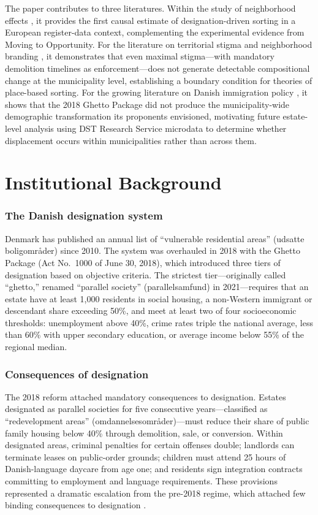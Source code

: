 \documentclass[12pt]{article}
\begin{document}
The paper contributes to three literatures. Within the study of neighborhood effects \citep{kling2007experimental, chetty2016effects}, it provides the first causal estimate of designation-driven sorting in a European register-data context, complementing the experimental evidence from Moving to Opportunity. For the literature on territorial stigma and neighborhood branding \citep{wacquant2007territorial, jensen2012making, galster2017drives}, it demonstrates that even maximal stigma---with mandatory demolition timelines as enforcement---does not generate detectable compositional change at the municipality level, establishing a boundary condition for theories of place-based sorting. For the growing literature on Danish immigration policy \citep{damm2014neighborhood, schultz2019permanent, foged2022language}, it shows that the 2018 Ghetto Package did not produce the municipality-wide demographic transformation its proponents envisioned, motivating future estate-level analysis using DST Research Service microdata to determine whether displacement occurs within municipalities rather than across them.

\section{Institutional Background}

\subsubsection*{The Danish designation system} Denmark has published an annual list of ``vulnerable residential areas'' (udsatte boligomr{\aa}der) since 2010. The system was overhauled in 2018 with the Ghetto Package (Act No.\ 1000 of June 30, 2018), which introduced three tiers of designation based on objective criteria. The strictest tier---originally called ``ghetto,'' renamed ``parallel society'' (parallelsamfund) in 2021---requires that an estate have at least 1,000 residents in social housing, a non-Western immigrant or descendant share exceeding 50\%, and meet at least two of four socioeconomic thresholds: unemployment above 40\%, crime rates triple the national average, less than 60\% with upper secondary education, or average income below 55\% of the regional median.

\subsubsection*{Consequences of designation} The 2018 reform attached mandatory consequences to designation. Estates designated as parallel societies for five consecutive years---classified as ``redevelopment areas'' (omdannelsesomr{\aa}der)---must reduce their share of public family housing below 40\% through demolition, sale, or conversion. Within designated areas, criminal penalties for certain offenses double; landlords can terminate leases on public-order grounds; children must attend 25 hours of Danish-language daycare from age one; and residents sign integration contracts committing to employment and language requirements. These provisions represented a dramatic escalation from the pre-2018 regime, which attached few binding consequences to designation \citep{seemann2021danish}.
\end{document}

